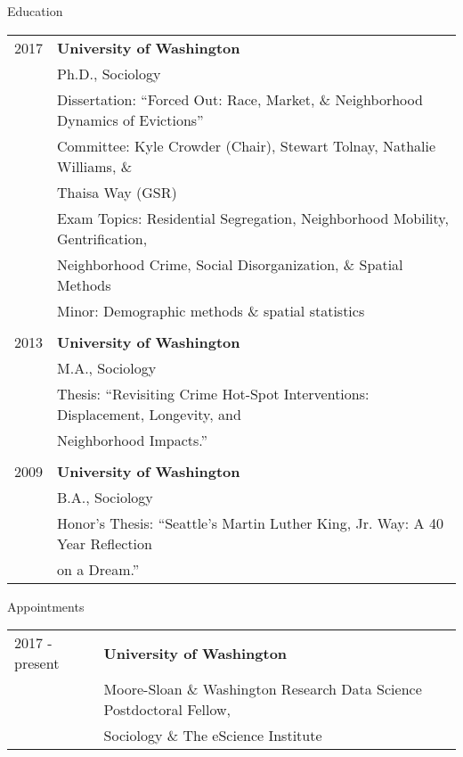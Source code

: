 \documentclass{resume} %
\begin{document}
\begin{rSection}{Education}
\vspace{5mm}
\begin{tabular}{ @{} >{}l @{\hspace{6ex}} l }

2017 	& \textbf{University of Washington}\\
		& Ph.D., Sociology\\
		& Dissertation: ``Forced Out: Race, Market, \& Neighborhood Dynamics of Evictions''\\
		& Committee: Kyle Crowder (Chair), Stewart Tolnay, Nathalie Williams, \&\\
		& \hspace{.82in}Thaisa Way (GSR)\\
		& Exam Topics: Residential Segregation, Neighborhood Mobility, Gentrification,\\
		& \hspace*{.82in}Neighborhood Crime, Social Disorganization, \& Spatial Methods\\
		& Minor: Demographic methods \& spatial statistics\\\\

2013	& \textbf{University of Washington}\\
		& M.A., Sociology\\
		& Thesis: ``Revisiting Crime Hot-Spot Interventions: Displacement, Longevity, and\\
		& \hspace*{.56in}Neighborhood Impacts.''\\\\

2009	& \textbf{University of Washington}\\
		& B.A., Sociology\\
		& Honor's Thesis: ``Seattle's Martin Luther King, Jr. Way: A 40 Year Reflection\\
		& \hspace*{1.12in}on a Dream.''
\end{tabular}
\vspace{5mm}
\end{rSection}

%
%

\begin{rSection}{Appointments}
\vspace{5mm}
\begin{tabular}{ @{} >{}l @{\hspace{6ex}} l }
2017 - present		&\textbf{University of Washington}\\
	 	& Moore-Sloan \& Washington Research Data Science Postdoctoral Fellow,\\
	 	& Sociology \& The eScience Institute\\
\end{tabular}
\vspace{5mm}
\end{rSection}
\end{document}
